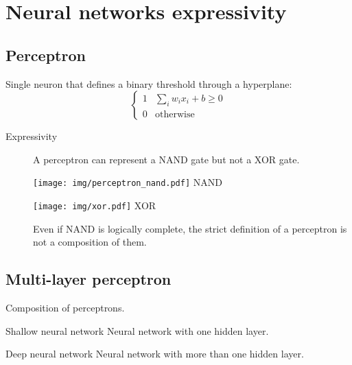 \chapter{Neural networks expressivity}



\section{Perceptron}

Single neuron that defines a binary threshold through a hyperplane:
\[
    \begin{cases}
        1 & \sum_{i} w_i x_i + b \geq 0 \\
        0 & \text{otherwise}
    \end{cases}    
\]

\begin{description}
    \item[Expressivity] 
        A perceptron can represent a NAND gate but not a XOR gate.
        \begin{center}
            \begin{minipage}{.2\textwidth}
                \centering
                \texttt{[image: img/perceptron\_nand.pdf]}
                \tiny NAND
            \end{minipage}
            \begin{minipage}{.2\textwidth}
                \centering
                \texttt{[image: img/xor.pdf]}
                \tiny XOR
            \end{minipage}
        \end{center}

        \begin{remark}
            Even if NAND is logically complete, the strict definition of a perceptron is not a composition of them.
        \end{remark}
\end{description}



\section{Multi-layer perceptron}

Composition of perceptrons.

\begin{descriptionlist}
    \item[Shallow neural network] 
        Neural network with one hidden layer.

    \item[Deep neural network] 
        Neural network with more than one hidden layer.
\end{descriptionlist}

